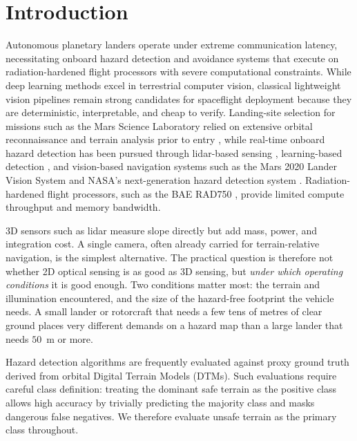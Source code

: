 \documentclass{article}
\begin{document}


\section{Introduction}
Autonomous planetary landers operate under extreme communication latency, necessitating onboard hazard detection and avoidance systems that execute on radiation-hardened flight processors with severe computational constraints. While deep learning methods excel in terrestrial computer vision, classical lightweight vision pipelines remain strong candidates for spaceflight deployment because they are deterministic, interpretable, and cheap to verify. Landing-site selection for missions such as the Mars Science Laboratory relied on extensive orbital reconnaissance and terrain analysis prior to entry \cite{golombek2012selection}, while real-time onboard hazard detection has been pursued through lidar-based sensing \cite{amzajerdian2013lidar}, learning-based detection \cite{moghe2020deep}, and vision-based navigation systems such as the Mars 2020 Lander Vision System \cite{johnson2020lvs} and NASA's next-generation hazard detection system \cite{restrepo2020hds}. Radiation-hardened flight processors, such as the BAE RAD750 \cite{berger2001rad750}, provide limited compute throughput and memory bandwidth.

3D sensors such as lidar measure slope directly but add mass, power, and integration cost. A single camera, often already carried for terrain-relative navigation, is the simplest alternative. The practical question is therefore not whether 2D optical sensing is as good as 3D sensing, but \emph{under which operating conditions} it is good enough. Two conditions matter most: the terrain and illumination encountered, and the size of the hazard-free footprint the vehicle needs. A small lander or rotorcraft that needs a few tens of metres of clear ground places very different demands on a hazard map than a large lander that needs $50$~m or more.

Hazard detection algorithms are frequently evaluated against proxy ground truth derived from orbital Digital Terrain Models (DTMs). Such evaluations require careful class definition: treating the dominant safe terrain as the positive class allows high accuracy by trivially predicting the majority class and masks dangerous false negatives. We therefore evaluate unsafe terrain as the primary class throughout.
\end{document}
